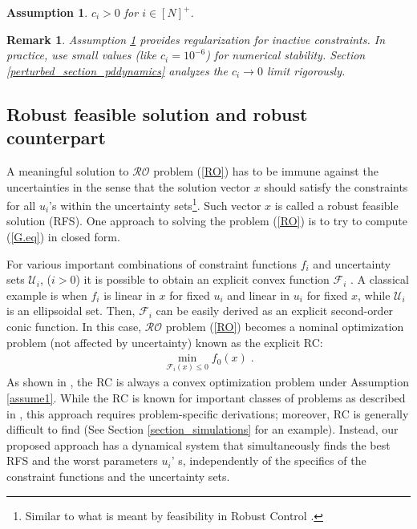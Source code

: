 \documentclass[journal,twoside,web]{ieeecolor}
\newcommand{\rev}[1]{\textcolor{revisionblue}{#1}}
\newtheorem{assumption}[theorem]{Assumption}
\newtheorem{remark}{Remark}
\begin{document}
\begin{assumption} \label{assume_c>0}
$c_i > 0$ for $i\in[N]^+$.
\end{assumption}

\begin{remark}\label{active_inactive_constraint_rem} 
\rev{Assumption \ref{assume_c>0} provides regularization for inactive constraints. In practice, use small values (like $c_i = 10^{-6}$) for numerical stability. Section \ref{perturbed_section_pddynamics} analyzes the $c_i \to 0$ limit rigorously.}
\end{remark}

\subsection{Robust feasible solution and robust counterpart}
A meaningful solution to $\mathcal{RO}$ problem (\ref{RO}) has to be immune against the uncertainties in the sense that the solution vector $x$ should satisfy the constraints for all $u_i$'s within the uncertainty sets\footnote{Similar to what is meant by feasibility in Robust Control \cite{zhou1995}.}. Such vector $x$ is called a robust feasible solution (RFS). One approach to solving the problem (\ref{RO}) is to try to compute (\ref{G.eq}) in closed form.

For various important combinations of constraint functions $f_i$ and uncertainty sets $\mathcal{U}_i$, ($i>0$) it is possible to obtain an explicit convex function $\mathcal{F}_i$ \cite{bental2009}. A classical example is when $f_i$ is linear in $x$ for fixed $u_i$ and linear in $u_i$ for fixed $x$, while $\mathcal{U}_i$ is an ellipsoidal set.
Then, $\mathcal{F}_i$ can be easily derived as an explicit second-order conic function.
In this case, $\mathcal{RO}$ problem (\ref{RO}) becomes a nominal optimization problem (not affected by uncertainty) known as the explicit RC:
\begin{align} \label{rc}
\displaystyle \min_{\mathcal{F}_i(x)\leq 0} f_0(x)\;.
\end{align}
As shown in \cite{bental2009-2}, the RC is always a convex optimization problem under Assumption \ref{assume1}. While the RC is known for important classes of problems as described in \cite{bertsimas2011}, this approach requires problem-specific derivations; moreover, RC is generally difficult to find (See Section \ref{section_simulations} for an example). Instead, our proposed approach has a dynamical system that simultaneously finds the best RFS and the worst parameters $u_i$' s, independently of the specifics of the constraint functions and the uncertainty sets.
\end{document}
